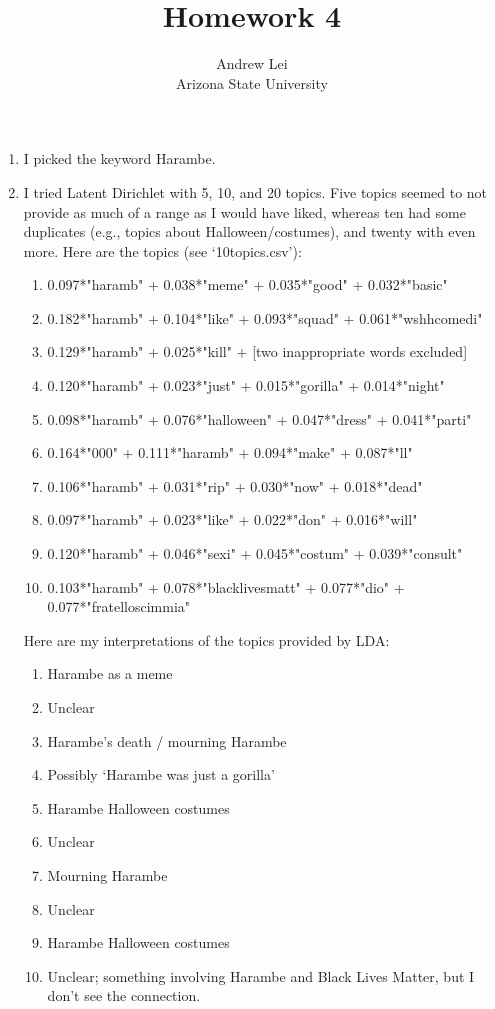 \documentclass{article}
\begin{document}
	\setlength{\droptitle}{-10em}
	\title{Homework 4}
	\author{Andrew Lei\\Arizona State University}
	\maketitle
	
	\begin{enumerate}
		\item I picked the keyword Harambe.
		\item I tried Latent Dirichlet with 5, 10, and 20 topics. Five topics seemed to not provide as much of a range as I would have liked, whereas ten had some duplicates (e.g., topics about Halloween/costumes), and twenty with even more. Here are the topics (see `10topics.csv'):
		\begin{enumerate}[label=(\roman*)]
			\item 0.097*"haramb" + 0.038*"meme" + 0.035*"good" + 0.032*"basic"
			\item 0.182*"haramb" + 0.104*"like" + 0.093*"squad" + 0.061*"wshhcomedi"
			\item 0.129*"haramb" + 0.025*"kill" + [two inappropriate words excluded]
			\item 0.120*"haramb" + 0.023*"just" + 0.015*"gorilla" + 0.014*"night"
			\item 0.098*"haramb" + 0.076*"halloween" + 0.047*"dress" + 0.041*"parti"
			\item 0.164*"000" + 0.111*"haramb" + 0.094*"make" + 0.087*"ll"
			\item 0.106*"haramb" + 0.031*"rip" + 0.030*"now" + 0.018*"dead"
			\item 0.097*"haramb" + 0.023*"like" + 0.022*"don" + 0.016*"will"
			\item 0.120*"haramb" + 0.046*"sexi" + 0.045*"costum" + 0.039*"consult"
			\item 0.103*"haramb" + 0.078*"blacklivesmatt" + 0.077*"dio" + 0.077*"fratelloscimmia"
		\end{enumerate}
		Here are my interpretations of the topics provided by LDA:
		\begin{enumerate}[label=(\roman*)]
			\item Harambe as a meme
			\item Unclear
			\item Harambe's death / mourning Harambe
			\item Possibly `Harambe was just a gorilla'
			\item Harambe Halloween costumes
			\item Unclear
			\item Mourning Harambe
			\item Unclear
			\item Harambe Halloween costumes
			\item Unclear; something involving Harambe and Black Lives Matter, but I don't see the connection.
		\end{enumerate}
		

\end{enumerate}
\end{document}
